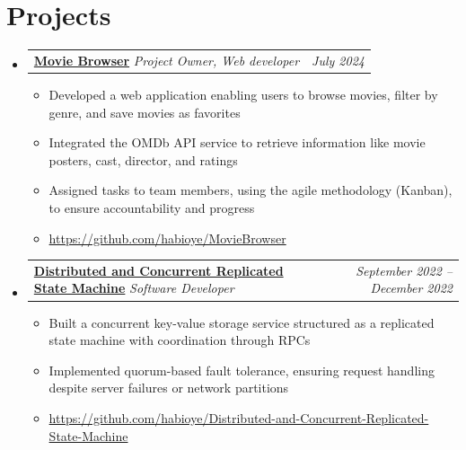 \documentclass[a4paper,11pt]{article}
\makeatletter
\newcommand{\resumeProjectalt}[4]{
\vspace{0.5mm}\item %
    \begin{tabular*}{0.98\textwidth}[t]{l@{\extracolsep{\fill}}r}
        \textbf{#1}      \footnotesize{\textit{#2}}  &  \footnotesize{#4} \textit{\footnotesize{#3}} \\
       
    \end{tabular*}
    \vspace{-2.4mm} %
}
\newenvironment{resumeSubHeadingList}{\begin{itemize}[leftmargin=*,labelsep=1.2mm, label={}]}{\end{itemize}\vspace{2mm}} %
\newenvironment{resumeItemList}{\begin{justify}\begin{itemize}[leftmargin=3ex, rightmargin=2ex, noitemsep,labelsep=1.2mm,itemsep=0mm]\small}{\end{itemize}\end{justify}\vspace{-2mm}}  %
\newcommand{\bulletend}{}
\makeatother
\begin{document}
\section{\textbf{Projects}}
\begin{resumeSubHeadingList}
    \vspace{-1mm}%
    \resumeProjectalt{\href{https://github.com/habioye/MovieBrowser}{Movie Browser}}{Project Owner, Web developer}{July 2024}{}
    \vspace{-1mm}%
    \begin{resumeItemList}
        \item {Developed a web application enabling users to browse movies, filter by genre, and save movies as favorites\bulletend}
        \item {Integrated the OMDb API service to retrieve information like movie posters, cast, director, and ratings\bulletend}
        \item {Assigned tasks to team members, using the agile methodology (Kanban), to ensure accountability and progress\bulletend}
        \item {\href{https://github.com/habioye/MovieBrowser}{https://github.com/habioye/MovieBrowser}}
    \end{resumeItemList}
    \vspace{-3.5mm}%
    \resumeProjectalt{\href{https://github.com/habioye/Distributed-and-Concurrent-Replicated-State-Machine}{Distributed and Concurrent Replicated State Machine}}
    {Software Developer}{September 2022 -- December 2022}{}
    \vspace{-1mm}%
    \begin{resumeItemList}
        \item{Built a concurrent key-value storage service structured as a replicated state machine with coordination through RPCs\bulletend}
        \item{Implemented quorum-based fault tolerance, ensuring request handling despite server failures or network partitions\bulletend}
        \item {\href{https://github.com/habioye/Distributed-and-Concurrent-Replicated-State-Machine}{https://github.com/habioye/Distributed-and-Concurrent-Replicated-State-Machine}}
    \end{resumeItemList}
    \vspace{-2mm} %
\end{resumeSubHeadingList}
\end{document}

